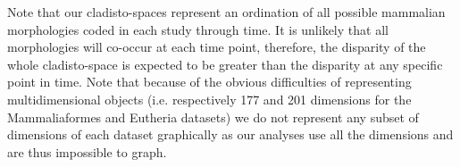 \documentclass[12pt,letterpaper]{article}
\begin{document}
Note that our cladisto-spaces represent an ordination of all possible mammalian morphologies coded in each study through time.
It is unlikely that all morphologies will co-occur at each time point, therefore, the disparity of the whole cladisto-space is expected to be greater than the disparity at any specific point in time.
Note that because of the obvious difficulties of representing multidimensional objects (i.e. respectively 177 and 201 dimensions for the Mammaliaformes and Eutheria datasets) %
we do not represent any subset of dimensions of each dataset graphically \citep[c.f.][]{Foote01071994,Wesley-Hunt2005} as our analyses use all the dimensions and are thus impossible to graph. %

\end{document}
